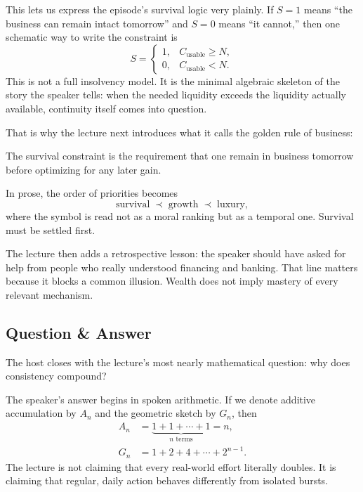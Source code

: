This lets us express the episode's survival logic very plainly. If \(S=1\) means ``the business can remain intact tomorrow'' and \(S=0\) means ``it cannot,'' then one schematic way to write the constraint is
\begin{equation}
S=
\begin{cases}
1, & C_{\mathrm{usable}}\ge N,\\
0, & C_{\mathrm{usable}}<N.
\end{cases}
\end{equation}
This is not a full insolvency model. It is the minimal algebraic skeleton of the story the speaker tells: when the needed liquidity exceeds the liquidity actually available, continuity itself comes into question.

That is why the lecture next introduces what it calls the golden rule of business:
\begin{definition}
The survival constraint is the requirement that one remain in business tomorrow before optimizing for any later gain.
\end{definition}

In prose, the order of priorities becomes
\[
\text{survival} \;\prec\; \text{growth} \;\prec\; \text{luxury},
\]
where the symbol is read not as a moral ranking but as a temporal one. Survival must be settled first.

The lecture then adds a retrospective lesson: the speaker should have asked for help from people who really understood financing and banking. That line matters because it blocks a common illusion. Wealth does not imply mastery of every relevant mechanism.

\subsection{Question \& Answer}

The host closes with the lecture's most nearly mathematical question: why does consistency compound?

The speaker's answer begins in spoken arithmetic. If we denote additive accumulation by \(A_n\) and the geometric sketch by \(G_n\), then
\begin{align}
A_n &= \underbrace{1+1+\cdots+1}_{n\text{ terms}} = n,\\
G_n &= 1+2+4+\cdots+2^{n-1}.
\end{align}
The lecture is not claiming that every real-world effort literally doubles. It is claiming that regular, daily action behaves differently from isolated bursts.

